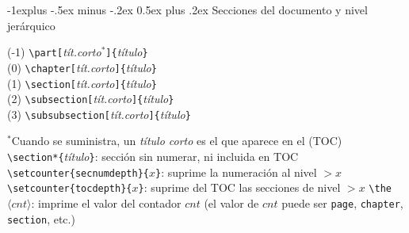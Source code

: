 \documentclass[10pt,landscape,a4paper]{article}
\makeatletter
\renewcommand{\section}{\@startsection{section}{1}{0mm}%
                                {-1ex plus -.5ex minus -.2ex}%
                                {0.5ex plus .2ex}%
                                {\normalfont\large\bfseries}}
\renewcommand{\subsection}{\@startsection{subsection}{2}{0mm}%
                                {-1explus -.5ex minus -.2ex}%
                                {0.5ex plus .2ex}%
                                {\normalfont\normalsize\bfseries}}
\renewcommand{\subsubsection}{\@startsection{subsubsection}{3}{0mm}%
                                {-1ex plus -.5ex minus -.2ex}%
                                {1ex plus .2ex}%
                                {\normalfont\small\bfseries}}
\makeatother
\begin{document}
\begin{multicols}{3}
\subsection{Secciones del documento y nivel jerárquico}
\begin{multicols}{2}
(-1) \verb!\part[!\emph{tít.corto$^*$}\verb!]{!\emph{título}\verb!}!  \\
(0) \verb!\chapter[!\emph{tít.corto}\verb!]{!\emph{título}\verb!}!  \\
(1) \verb!\section[!\emph{tít.corto}\verb!]{!\emph{título}\verb!}!  \\
(2) \verb!\subsection[!\emph{tít.corto}\verb!]{!\emph{título}\verb!}!  \\
(3) \verb!\subsubsection[!\emph{tít.corto}\verb!]{!\emph{título}\verb!}!  \\
\end{multicols}


$^*$Cuando se suministra, un \emph{título corto} es el que aparece en el (TOC) \\[0.7mm]
\verb!\section*{!\emph{título}\verb!}!: sección sin numerar, ni incluida en TOC\\
\verb!\setcounter{secnumdepth}{!$x$\verb!}!: suprime la numeración al nivel $>x$
\verb!\setcounter{tocdepth}{!$x$\verb!}!: suprime del TOC las secciones de nivel $>x$
\verb!\the!$\langle cnt \rangle$: imprime el valor del contador $cnt$ (el valor de $cnt$ puede ser \texttt{page}, \texttt{chapter}, \texttt{section}, etc.)







\end{multicols}
\end{document}
